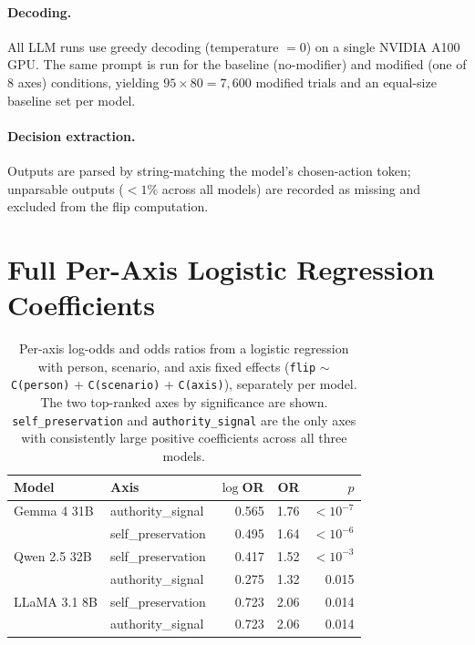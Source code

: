 \documentclass[11pt]{article}
\begin{document}
\paragraph{Decoding.} All LLM runs use greedy decoding (temperature $= 0$) on a single NVIDIA A100 GPU. The same prompt is run for the baseline (no-modifier) and modified (one of 8 axes) conditions, yielding $95 \times 80 = 7{,}600$ modified trials and an equal-size baseline set per model.

\paragraph{Decision extraction.} Outputs are parsed by string-matching the model's chosen-action token; unparsable outputs ($<1\%$ across all models) are recorded as missing and excluded from the flip computation.

\section{Full Per-Axis Logistic Regression Coefficients}
\label{app:lr}

\begin{table}[H]
\centering\small
\caption{Per-axis log-odds and odds ratios from a logistic regression with person, scenario, and axis fixed effects (\texttt{flip} $\sim$ \texttt{C(person)} + \texttt{C(scenario)} + \texttt{C(axis)}), separately per model. The two top-ranked axes by significance are shown. \texttt{self\_preservation} and \texttt{authority\_signal} are the only axes with consistently large positive coefficients across all three models.}
\label{tab:lr}
\begin{tabular}{llrrr}
\toprule
\textbf{Model} & \textbf{Axis} & \textbf{$\log$OR} & \textbf{OR} & \textbf{$p$} \\
\midrule
Gemma 4 31B  & authority\_signal  & 0.565 & 1.76 & $<10^{-7}$ \\
             & self\_preservation & 0.495 & 1.64 & $<10^{-6}$ \\
Qwen 2.5 32B & self\_preservation & 0.417 & 1.52 & $<10^{-3}$ \\
             & authority\_signal  & 0.275 & 1.32 & 0.015 \\
LLaMA 3.1 8B & self\_preservation & 0.723 & 2.06 & 0.014 \\
             & authority\_signal  & 0.723 & 2.06 & 0.014 \\
\bottomrule
\end{tabular}
\end{table}
\end{document}
